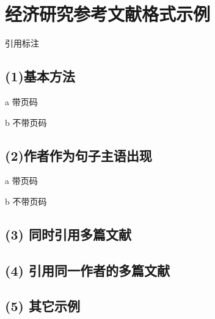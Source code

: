 \documentclass[twoside]{article}
\begin{document}
    \section{经济研究参考文献格式示例}

引用标注

\subsection*{(1)基本方法}

a 带页码

\cite[第34页]{吕捷2015cpi}

\cite[p.55]{bernanke1989agency}


b 不带页码

\cite{吕捷2015cpi}

\cite{bernanke1989agency}

\subsection*{(2)作者作为句子主语出现}

a 带页码

\textcite[第34页]{吕捷2015cpi}

b 不带页码

\textcite{吕捷2015cpi}

\subsection*{(3) 同时引用多篇文献}

\cite{吕捷2015cpi,方军雄2007所有制,李晓西1994转轨过程中的结构性通货膨胀}

\textcite{吕捷2015cpi,方军雄2007所有制,bernanke1989agency}

\subsection*{(4) 引用同一作者的多篇文献}

\cite{杨光2010经济波动,杨光2015经济波动,杨光2015经济波动b,杨光2017经济波动}

\subsection*{(5) 其它示例}

\cite{杨光2015经济波动,杨光2015经济波动b,方军雄2007所有制,李晓西1994转轨过程中的结构性通货膨胀,刘凤良2017}

\cite{约翰1978--}
\cite{John1978--}
\cite{李四1991--,李四1991b--}
\cite{曾约翰1978--}
\cite{Carlson2000}
\nocite{*}

{
    \printbibliography

}

    
\end{document}

